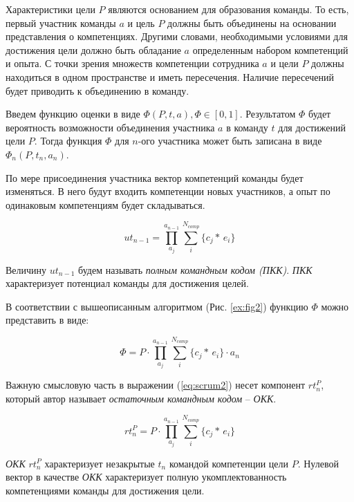 Характеристики цели $P$ являются основанием для образования команды. 
То есть, первый участник команды $a$ и цель $P$ должны быть объединены на основании представления о компетенциях. 
Другими словами, необходимыми условиями для достижения цели должно быть обладание $a$ определенным набором компетенций и опыта. 
С точки зрения множеств компетенции сотрудника $a$ и цели $P$ должны находиться в одном пространстве и иметь пересечения. 
Наличие пересечений будет приводить к объединению в команду.

Введем функцию оценки в виде $\Phi(P,t,a), \Phi \in [0,1] $. 
Результатом $\Phi$ будет вероятность возможности объединения участника $a$  в команду $t$ для достижений цели $P$. 
Тогда функция $\Phi$ для $n$-ого участника может быть записана в виде $\Phi_n(P,t_{n},a_n)$.

По мере присоединения участника вектор компетенций команды будет изменяться.
В него будут входить компетенции новых участников, а опыт по одинаковым компетенциям будет складываться.

\begin{equation} 
\label{eq:scrum1}
ut_{n-1} = \prod_{a_j}^{a_{n-1}}\sum_i^{N_{comp}}\bigg\{c_j * \, e_i \bigg\}
\end{equation}

Величину $ut_{n-1}$ будем называть \emph{полным командным кодом (ПКК)}. 
\emph{ПКК} характеризует потенциал команды для достижения целей.

В соответствии с вышеописанным алгоритмом (Рис. \ref{ex:fig2}) функцию $\Phi$ можно представить в виде:

\begin{equation} 
\label{eq:scrum2}
\Phi  = P \cdot \prod_{a_j}^{a_{n-1}}\sum_i^{N_{comp}} \bigg\{c_j *\, e_i \bigg\} \cdot a_n
\end{equation}

Важную смысловую часть в выражении (\ref{eq:scrum2}) несет компонент $rt^P_n$, который автор называет \emph{остаточным командным кодом}  -- \emph{ОКК}.

\begin{equation} 
\label{eq:scrum3}
rt_n^P  = P \cdot \prod_{a_j}^{a_{n-1}}\sum_i^{N_{comp}} \bigg\{c_j *\, e_i \bigg\}
\end{equation}

\emph{ОКК} $rt_n^P$ характеризует незакрытые $t_n$ командой компетенции цели $P$. 
Нулевой вектор в качестве \emph{ОКК} характеризует полную укомплектованность компетенциями команды для достижения цели.

